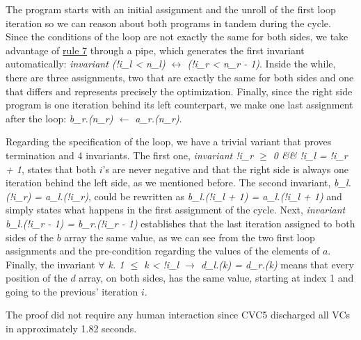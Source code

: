 The program starts with an initial assignment and the unroll of the first loop iteration so we can reason about both programs in tandem during the cycle.
Since the conditions of the loop are not exactly the same for both sides, we take advantage of \hyperref[fig:translation-biprograms-rules]{rule 7} through a pipe, which generates the first invariant automatically: \emph{invariant (!i\_l < n\_l) $\leftrightarrow$ (!i\_r < n\_r - 1)}.
Inside the while, there are three assignments, two that are exactly the same for both sides and one that differs and represents precisely the optimization.
Finally, since the right side program is one iteration behind its left counterpart, we make one last assignment after the loop: \emph{b\_r.(n\_r) $\leftarrow$ a\_r.(n\_r)}.

Regarding the specification of the loop, we have a trivial variant that proves termination and 4 invariants.
The first one, \emph{invariant !i\_r $\geq$ 0 \&\& !i\_l = !i\_r + 1}, states that both $i$'s are never negative and that the right side is always one iteration behind the left side, as we mentioned before.
The second invariant, \emph{b\_l.(!i\_r) = a\_l.(!i\_r)}, could be rewritten as \emph{b\_l.(!i\_l + 1) = a\_l.(!i\_l + 1)} and simply states what happens in the first assignment of the cycle.
Next, \emph{invariant b\_l.(!i\_r - 1) = b\_r.(!i\_r - 1)} establishes that the last iteration assigned to both sides of the $b$ array the same value, as we can see from the two first loop assignments and the pre-condition regarding the values of the elements of $a$.
Finally, the invariant \emph{$\forall$ k. 1 $\leq$ k < !i\_l $\rightarrow$ d\_l.(k) = d\_r.(k)} means that every position of the $d$ array, on both sides, has the same value, starting at index 1 and going to the previous' iteration $i$.

The proof did not require any human interaction since CVC5 discharged all VCs in approximately 1.82 seconds.


